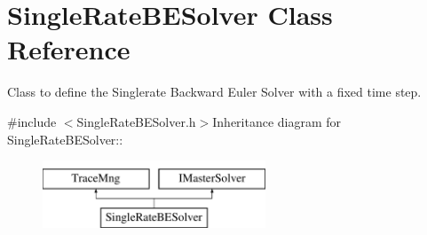 \hypertarget{classSingleRateBESolver}{
\section{SingleRateBESolver Class Reference}
\label{classSingleRateBESolver}
}


Class to define the Singlerate Backward Euler Solver with a fixed time step.  


{\ttfamily \#include $<$SingleRateBESolver.h$>$}Inheritance diagram for SingleRateBESolver::\begin{figure}[H]
\begin{center}
\leavevmode
\includegraphics[height=2cm]{classSingleRateBESolver}
\end{center}
\end{figure}
